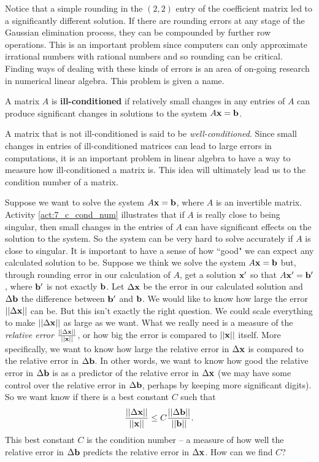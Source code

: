 Notice that a simple rounding in the $(2,2)$ entry of the coefficient matrix led to a significantly different solution. If there are rounding errors at any stage of the Gaussian elimination process, they can be compounded by further row operations. This is an important problem since computers can only approximate irrational numbers with rational numbers and so rounding can be critical. Finding ways of dealing with these kinds of errors is an area of on-going research in numerical linear algebra. This problem is given a name.

\begin{definition} A matrix $A$ is \textbf{ill-conditioned} if relatively small changes in any entries of $A$ can produce significant changes in solutions to the system $A\mathbf{x} = \mathbf{b}$.
\end{definition}

A matrix that is not ill-conditioned is said to be \emph{well-conditioned}. Since small changes in entries of ill-conditioned matrices can lead to large errors in computations, it is an important problem in linear algebra to have a way to measure how ill-conditioned a matrix is. This idea will ultimately lead us to the condition number of a matrix.

Suppose we want to solve the system $A \mathbf{x} = \mathbf{b}$, where $A$ is an invertible matrix. Activity \ref{act:7_c_cond_num} illustrates that if $A$ is really close to being singular, then small changes in the entries of $A$ can have significant effects on the solution to the system. So the system can be very hard to solve accurately if $A$ is close to singular. It is important to have a sense of how ``good" we can expect any calculated solution to be. Suppose we think we solve the system $A \mathbf{x} = \mathbf{b}$ but, through rounding error in our calculation of $A$, get a solution $\mathbf{x}'$ so that $A \mathbf{x}' = \mathbf{b}'$, where $\mathbf{b}'$ is not exactly $\mathbf{b}$. Let $\Delta \mathbf{x}$ be the error in our calculated solution and $\Delta \mathbf{b}$ the difference between $\mathbf{b}'$ and $\mathbf{b}$. We would like to know how large the error $||\Delta \mathbf{x}||$ can be. But this isn't exactly the right question. We could scale everything to make $||\Delta \mathbf{x}||$ as large as we want. What we really need is a measure of the \emph{relative error} $\frac{||\Delta \mathbf{x}||}{||\mathbf{x}||}$, or how big the error is compared to $||\mathbf{x}||$ itself. More specifically, we want to know how large the relative error in $\Delta \mathbf{x}$ is compared to the relative error in $\Delta \mathbf{b}$. In other words, we want to know how good the relative error in $\Delta \mathbf{b}$ is as a predictor of the relative error in $\Delta \mathbf{x}$ (we may have some control over the relative error in $\Delta \mathbf{b}$, perhaps by keeping more significant digits). So we want know if there is a best constant $C$ such that
\[\frac{||\Delta \mathbf{x}||}{||\mathbf{x}||} \leq C \frac{||\Delta \mathbf{b}||}{||\mathbf{b}||}.\]
This best constant $C$ is the condition number -- a measure of how well the relative error in $\Delta \mathbf{b}$ predicts the relative error in $\Delta \mathbf{x}$. How can we find $C$?

